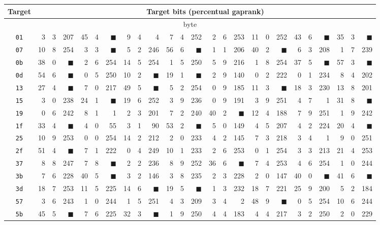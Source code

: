 \begin{tabular}{| c | r@{.} l@{\quad}r | r@{.} l@{\quad}r | r@{.} l@{\quad}r | r@{.} l@{\quad}r | r@{.} l@{\quad}r | r@{.} l@{\quad}r | r@{.} l@{\quad}r | r@{.} l@{\quad}r |}
	\hline
	Target & \multicolumn{24}{c|}{Target bits (percentual gap\quad rank)} \\
	\hline
	\hline
	\multicolumn{25}{|c|}{\nth{0} byte} \\
	\hline
	{\tt 01}&3&3&207&45&4&$\blacksquare$&9&4&4&7&4&252&2&6&253&11&0&252&43&6&$\blacksquare$&35&3&$\blacksquare$\\
	\hline
	{\tt 07}&10&8&254&3&3&$\blacksquare$&5&2&246&56&6&$\blacksquare$&1&1&206&40&2&$\blacksquare$&6&3&208&1&7&239\\
	\hline
	{\tt 0b}&38&0&$\blacksquare$&2&6&254&14&5&254&1&5&250&5&9&216&1&8&254&37&5&$\blacksquare$&57&3&$\blacksquare$\\
	\hline
	{\tt 0d}&54&6&$\blacksquare$&0&5&250&10&2&$\blacksquare$&19&1&$\blacksquare$&2&9&140&0&2&222&0&1&234&8&4&202\\
	\hline
	{\tt 13}&27&4&$\blacksquare$&7&0&217&49&5&$\blacksquare$&5&2&254&0&9&185&11&3&$\blacksquare$&18&3&230&13&8&201\\
	\hline
	{\tt 15}&3&0&238&24&1&$\blacksquare$&19&6&252&3&9&236&0&9&191&3&9&251&4&7&1&31&8&$\blacksquare$\\
	\hline
	{\tt 19}&0&6&242&8&1&1&2&3&201&7&2&240&40&2&$\blacksquare$&12&4&188&7&9&251&1&9&242\\
	\hline
	{\tt 1f}&33&4&$\blacksquare$&4&0&55&3&1&90&53&2&$\blacksquare$&5&0&149&4&5&207&4&2&224&20&4&$\blacksquare$\\
	\hline
	{\tt 25}&10&9&253&0&0&254&14&2&212&2&0&233&4&2&145&7&3&218&3&4&1&9&0&251\\
	\hline
	{\tt 2f}&51&4&$\blacksquare$&7&1&222&0&4&249&10&1&233&2&6&253&0&1&254&3&3&213&21&4&253\\
	\hline
	{\tt 37}&8&8&247&7&8&$\blacksquare$&2&2&236&8&9&252&36&6&$\blacksquare$&7&4&253&4&6&254&1&0&244\\
	\hline
	{\tt 3b}&7&6&228&40&5&$\blacksquare$&3&2&146&3&8&235&2&3&228&2&0&147&40&0&$\blacksquare$&41&6&$\blacksquare$\\
	\hline
	{\tt 3d}&18&7&253&11&5&225&14&6&$\blacksquare$&19&5&$\blacksquare$&1&3&232&18&7&221&25&9&200&5&2&184\\
	\hline
	{\tt 57}&3&6&243&1&0&244&1&5&251&4&3&209&3&4&2&48&9&$\blacksquare$&0&5&254&10&6&244\\
	\hline
	{\tt 5b}&45&5&$\blacksquare$&7&6&225&32&3&$\blacksquare$&1&9&250&4&4&183&4&4&217&3&2&250&2&0&229\\

\end{tabular}
